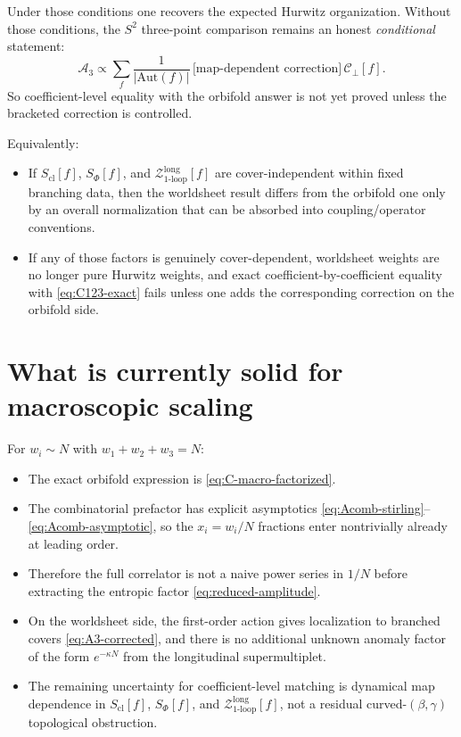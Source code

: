 \documentclass[11pt]{article}
\newcommand{\mc}[1]{\mathcal{#1}}
\begin{document}
Under those conditions one recovers the expected Hurwitz organization. Without those conditions, the $S^2$ three-point comparison remains an honest \emph{conditional} statement:
\begin{equation}
\mc A_3
\propto
\sum_f\frac{1}{|\mathrm{Aut}(f)|}\,
\big[\text{map-dependent correction}\big]\,
\mc C_\perp[f].
\end{equation}
So coefficient-level equality with the orbifold answer is not yet proved unless the bracketed correction is controlled.

Equivalently:
\begin{itemize}
\item If $S_{\mathrm{cl}}[f]$, $S_\Phi[f]$, and $\mc Z^{\mathrm{long}}_{1\text{-}\mathrm{loop}}[f]$ are cover-independent within fixed branching data, then the worldsheet result differs from the orbifold one only by an overall normalization that can be absorbed into coupling/operator conventions.
\item If any of those factors is genuinely cover-dependent, worldsheet weights are no longer pure Hurwitz weights, and exact coefficient-by-coefficient equality with \eqref{eq:C123-exact} fails unless one adds the corresponding correction on the orbifold side.
\end{itemize}

\section{What is currently solid for macroscopic scaling}
For $w_i\sim N$ with $w_1+w_2+w_3=N$:
\begin{itemize}
\item The exact orbifold expression is \eqref{eq:C-macro-factorized}.
\item The combinatorial prefactor has explicit asymptotics \eqref{eq:Acomb-stirling}--\eqref{eq:Acomb-asymptotic}, so the $x_i=w_i/N$ fractions enter nontrivially already at leading order.
\item Therefore the full correlator is not a naive power series in $1/N$ before extracting the entropic factor \eqref{eq:reduced-amplitude}.
\item On the worldsheet side, the first-order action gives localization to branched covers \eqref{eq:A3-corrected}, and there is no additional unknown anomaly factor of the form $e^{-\kappa N}$ from the longitudinal supermultiplet.
\item The remaining uncertainty for coefficient-level matching is dynamical map dependence in $S_{\mathrm{cl}}[f]$, $S_\Phi[f]$, and $\mc Z^{\mathrm{long}}_{1\text{-}\mathrm{loop}}[f]$, not a residual curved-$(\beta,\gamma)$ topological obstruction.
\end{itemize}
\end{document}
